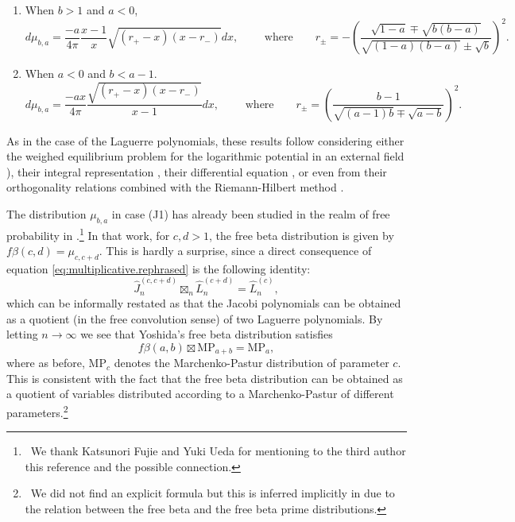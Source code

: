\documentclass[reqno,11pt]{amsart}
\theoremstyle{remark}
\newcommand{\lag}{\widehat {L}}
\newcommand{\jac}{\widehat {J}}
\begin{document}
\begin{itemize}
\begin{enumerate}[(J1)]
\item When $b >1$ and $a<0$,
\begin{equation*}
    d\mu_{b,a}=\frac{-a}{4\pi}\frac{x-1}{x}\sqrt{(r_+-x)(x-r_-)}dx, \qquad \text{ where} \qquad r_\pm=- \left(\frac{\sqrt{1-a}\mp \sqrt{b(b-a)}}{\sqrt{(1-a)(b-a)}\pm \sqrt{b}} \right)^2.
\end{equation*}

\item When $a<0$ and $b<a-1$. 
\begin{equation}
\label{eq.jacobi.limit.3}
    d\mu_{b,a}=\frac{-a x}{4\pi}\frac{\sqrt{(r_+-x)(x-r_-)}}{x-1}dx, \qquad \text{ where} \qquad r_\pm=\left(\frac{b-1}{\sqrt{(a-1)b}\mp \sqrt{a-b}} \right)^2.
\end{equation}
\end{enumerate}
\end{itemize}
As in the case of the Laguerre polynomials, these results follow considering either the weighed equilibrium problem for the logarithmic potential in an external field \cite[Ch.~IV]{MR1485778}), their integral representation \cite{MR1342385}, their differential equation \cite{MR1317299, MR1914357}, or even from their orthogonality relations \cite{MR2149265} combined with the Riemann-Hilbert method \cite{MR2124460}.

The distribution $\mu_{b,a}$ in case (J1) has already been studied in the realm of free probability in \cite[Definition 3.10]{yoshida2020remarks}.\footnote{\, We thank Katsunori Fujie and Yuki Ueda for mentioning to the third author this reference and the possible connection.} In that work, for $c,d>1$, the free beta distribution is given by $f\beta(c,d)=\mu_{c,c+d}$. This is hardly a surprise, since a direct consequence of equation \eqref{eq:multiplicative.rephrased} is the following identity:
$$\jac_n^{(c,c+d)}\boxtimes_n \lag_n^{(c+d)}= \lag_n^{(c)},
$$
which can be informally restated as that the Jacobi polynomials can be obtained as a quotient (in the free convolution sense) of two Laguerre polynomials.  By letting $n\to \infty$ we see that Yoshida's free beta distribution satisfies
$$f\beta(a,b) \boxtimes \text{MP}_{a+b}= \text{MP}_{a},$$
where as before, $\text{MP}_c$ denotes the Marchenko-Pastur distribution of parameter $c$. This is consistent with the fact that the free beta distribution can be obtained as a quotient of variables distributed according to a Marchenko-Pastur of different parameters.\footnote{\, We did not find an explicit formula but this is inferred implicitly in \cite{yoshida2020remarks} due to the relation between the free beta and the free beta prime distributions.}
\end{document}

